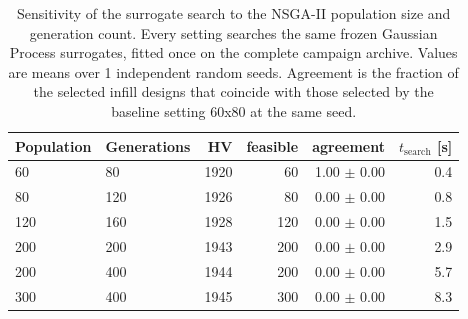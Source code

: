 \begin{table}[htbp]
\centering
\caption{Sensitivity of the surrogate search to the NSGA-II population size and generation count. Every setting searches the same frozen Gaussian Process surrogates, fitted once on the complete campaign archive. Values are means over 1 independent random seeds. Agreement is the fraction of the selected infill designs that coincide with those selected by the baseline setting 60x80 at the same seed.}
\label{tab:nsga_sensitivity}
\begin{tabular}{llrrrr}
\toprule
Population & Generations & HV & feasible & agreement & $t_{\mathrm{search}}$ [s] \\
\midrule
60 & 80 & 1920 & 60 & 1.00 $\pm$ 0.00 & 0.4 \\
80 & 120 & 1926 & 80 & 0.00 $\pm$ 0.00 & 0.8 \\
120 & 160 & 1928 & 120 & 0.00 $\pm$ 0.00 & 1.5 \\
200 & 200 & 1943 & 200 & 0.00 $\pm$ 0.00 & 2.9 \\
200 & 400 & 1944 & 200 & 0.00 $\pm$ 0.00 & 5.7 \\
300 & 400 & 1945 & 300 & 0.00 $\pm$ 0.00 & 8.3 \\
\bottomrule
\end{tabular}
\end{table}
